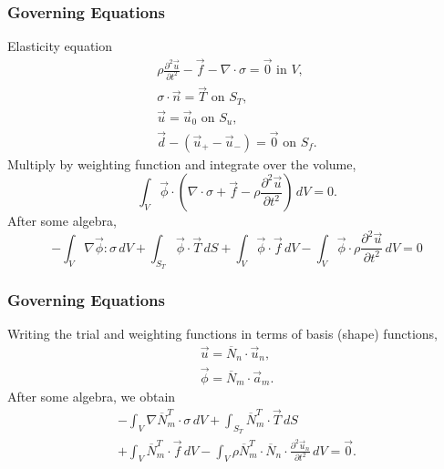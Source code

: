 \documentclass{beamer}
\newcommand{\tensor}[1]{\overline{#1}}
\begin{document}
\begin{frame}
  \frametitle{Governing Equations}
  \summary{}

  \vfill
  Elasticity equation
  \begin{gather}
    \rho \frac{\partial^2\vec{u}}{\partial t^2} - \vec{f} 
    - \mathsf{\nabla} \cdot \mathsf{\sigma} = \vec{0} \text{ in }V, \\
    \mathsf{\sigma} \cdot \vec{n} = \vec{T} \text{ on }S_T, \\
    \vec{u} = \vec{u}_0 \text{ on }S_u, \\
    \vec{d} - (\vec{u}_{+} - \vec{u}_{-}) = \vec{0}
    \text{ on }S_f.
  \end{gather}
  Multiply by weighting function and integrate over the volume,
  \begin{equation}
    \int_{V} \vec{\phi} \cdot 
    \left( \mathsf{\nabla} \cdot \mathsf{\sigma} + \vec{f} -
    \rho\frac{\partial^{2}\vec{u}}{\partial t^{2}} \right) 
    \, dV=0.
  \end{equation}
  After some algebra,
  \begin{equation}
    - \int_{V} \nabla \vec{\phi} : \mathsf{\sigma} \, dV
    + \int_{S_T} \vec{\phi} \cdot \vec{T} \, dS
    + \int_{V} \vec{\phi} \cdot \vec{f} \, dV
    - \int_{V} \vec{\phi} \cdot \rho \frac{\partial^{2}\vec{u}}{\partial t^{2}} \, dV
    =0
  \end{equation}
  \vfill
  
\end{frame}


\begin{frame}
  \frametitle{Governing Equations}
  \summary{}

  \vfill
  Writing the trial and weighting functions in terms of basis (shape)
  functions,
  \begin{gather}
    \vec{u} = \tensor{N}_n \cdot \vec{u}_n, \\
    \vec{\phi} = \tensor{N}_m \cdot \vec{a}_m.
  \end{gather}
  After some algebra, we obtain
  \begin{multline}
    - \int_{V} \nabla \tensor{N}_m^T \cdot \mathsf{\sigma} \, dV
    + \int_{S_T} \tensor{N}_m^T \cdot \vec{T} \, dS \\
    + \int_{V} \tensor{N}_m^T \cdot \vec{f} \, dV
    - \int_{V} \rho \tensor{N}_m^T \cdot \tensor{N}_n \cdot \frac{\partial^2 \vec{u}_n}{\partial
  t^2} \, dV
=\vec{0}.
  \end{multline}
  \vfill

\end{frame}
\end{document}

